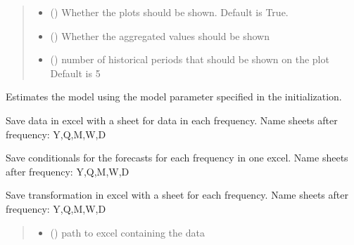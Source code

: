 \documentclass[letterpaper,10pt,english]{sphinxmanual}
\begin{document}
\begin{fulllineitems}
\begin{fulllineitems}
\begin{quote}
\begin{description}
\begin{itemize}
\item {} 
\sphinxAtStartPar
{} () \textendash{} Whether the plots should be shown. Default is True.

\item {} 
\sphinxAtStartPar
{} () \textendash{} Whether the aggregated values should be shown

\item {} 
\sphinxAtStartPar
{} () \textendash{} number of historical periods that should be shown on the plot
Default is 5

\end{itemize}

\end{description}\end{quote}

\end{fulllineitems}


\begin{fulllineitems}
\label{\detokenize{MUFBVAR:MUFBVAR.mufbvar.multifrequency_var.fit}}
\pysigstartsignatures
{}
\pysigstopsignatures
\sphinxAtStartPar
Estimates the model using the model parameter specified in the initialization.

\sphinxAtStartPar
Save data in excel with a sheet for data in each frequency. Name sheets after frequency: Y,Q,M,W,D

\sphinxAtStartPar
Save conditionals for the forecasts for each frequency in one excel. Name sheets after frequency: Y,Q,M,W,D

\sphinxAtStartPar
Save transformation in excel with a sheet for each frequency. Name sheets after frequency: Y,Q,M,W,D
\begin{quote}\begin{description}
\begin{itemize}
\item {} 
\sphinxAtStartPar
{} () \textendash{} path to excel containing the data


\end{itemize}
\end{description}
\end{quote}
\end{fulllineitems}
\end{fulllineitems}
\end{document}
